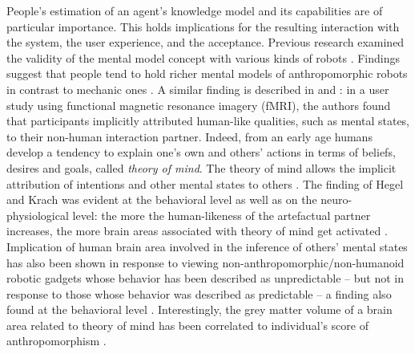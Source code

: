 \documentclass{frontiersSCNS} %
\begin{document}
People's estimation of an agent's knowledge model and its capabilities are of
particular importance. This holds implications for the resulting interaction
with the system, the user experience, and the acceptance. Previous research
examined the validity of the mental model concept with various kinds of robots
\citep{schmitz_concepts_2011,kiesler_mental_2002}. Findings suggest that people
tend to hold richer mental models of anthropomorphic robots in contrast to
mechanic ones \citep{kiesler_mental_2002}. A similar finding is described in
\cite{hegel_understanding_2008} and \cite{krach_can_2008}: in a user study using
functional magnetic resonance imagery (fMRI), the authors found that
participants implicitly attributed human-like qualities, such as mental states,
to their non-human interaction partner. Indeed, from an early age humans develop
a tendency to explain one's own and others' actions in terms of beliefs, desires
and goals, called \textit{theory of mind}. The theory of mind allows the
implicit attribution of intentions and other mental states to others
\citep{premack1978does,leslie_pretense_1987,Frith2003}.  The finding of
Hegel and Krach was evident at the
behavioral level as well as on the neuro-physiological level: the more the
human-likeness of the artefactual partner increases, the more brain areas
associated with theory of mind  get activated \citep{krach_can_2008}.
Implication of human brain area involved in the inference of others' mental
states has also been shown in response to viewing
non-anthropomorphic/non-humanoid robotic gadgets whose behavior has been
described as unpredictable -- but not in response to those whose behavior was
described as predictable -- a finding also found at the behavioral level
\citep{Waytz2010}.  Interestingly, the grey matter volume of a brain area
related to theory of mind has been correlated to individual's score of
anthropomorphism \citep{cullen2013individual}.
\end{document}
